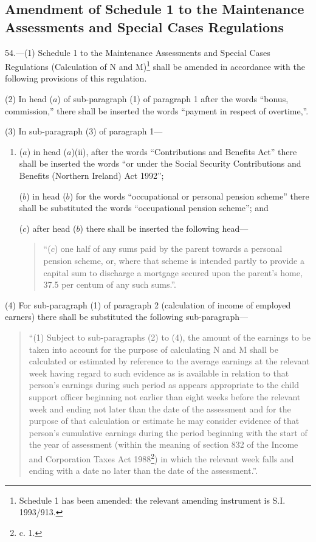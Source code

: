 \documentclass[12pt,a4paper]{article}
\begin{document}
\subsection[54. Amendment of Schedule 1 to the Maintenance Assessments and Special Cases Regulations]{Amendment of Schedule 1 to the Maintenance Assessments and Special Cases Regulations}

54.—(1) Schedule 1 to the Maintenance Assessments and Special Cases Regulations (Calculation of N and M)\footnote{\frenchspacing Schedule 1 has been amended: the relevant amending instrument is S.I. 1993/913.} shall be amended in accordance with the following provisions of this regulation.

(2) In head ($a$) of sub-paragraph (1) of paragraph 1 after the words “bonus, commission,” there shall be inserted the words “payment in respect of overtime,”.

(3) In sub-paragraph (3) of paragraph 1—
\begin{enumerate}\item[]
($a$) in head ($a$)(ii), after the words “Contributions and Benefits Act” there shall be inserted the words “or under the Social Security Contributions and Benefits (Northern Ireland) Act 1992”;

($b$) in head ($b$) for the words “occupational or personal pension scheme” there shall be substituted the words “occupational pension scheme”; and

($c$) after head ($b$) there shall be inserted the following head—
\begin{quotation}
“($c$) one half of any sums paid by the parent towards a personal pension scheme, or, where that scheme is intended partly to provide a capital sum to discharge a mortgage secured upon the parent’s home, 37.5 per centum of any such sums.”.
\end{quotation}
\end{enumerate}

(4) For sub-paragraph (1) of paragraph 2 (calculation of income of employed earners) there shall be substituted the following sub-paragraph—
\begin{quotation}
“(1) Subject to sub-paragraphs (2) to (4), the amount of the earnings to be taken into account for the purpose of calculating N and M shall be calculated or estimated by reference to the average earnings at the relevant week having regard to such evidence as is available in relation to that person’s earnings during such period as appears appropriate to the child support officer beginning not earlier than eight weeks before the relevant week and ending not later than the date of the assessment and for the purpose of that calculation or estimate he may consider evidence of that person’s cumulative earnings during the period beginning with the start of the year of assessment (within the meaning of section 832 of the Income and Corporation Taxes Act 1988\footnote{ c. 1.}) in which the relevant week falls and ending with a date no later than the date of the assessment.”.
\end{quotation}
\end{document}
